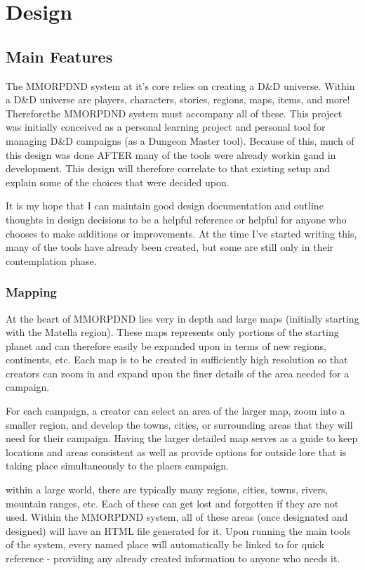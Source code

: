 \chapter{Design}

\section{Main Features}

The MMORPDND system at it's core relies on creating a D\&D universe. Within a D\&D universe are players, characters, stories, regions, maps, items, and more! Thereforethe MMORPDND system must accompany all of these. This project was initially conceived as a personal learning project and personal tool for managing D\&D campaigns (as a Dungeon Master tool). Because of this, much of this design was done AFTER many of the tools were already workin gand in development. This design will therefore correlate to that existing setup and explain some of the choices that were decided upon.

It is my hope that I can maintain good design documentation and outline thoughts in design decisions to be a helpful reference or helpful for anyone who chooses to make additions or improvements. At the time I've started writing this, many of the tools have already been created, but some are still only in their contemplation phase. 

\subsection{Mapping}

At the heart of MMORPDND lies very in depth and large maps (initially starting with the Matella region). These maps represents only portions of the starting planet and can therefore easily be expanded upon in terms of new regions, continents, etc. Each map is to be created in sufficiently high resolution so that creators can zoom in and expand upon the finer details of the area needed for a campaign.

For each campaign, a creator can select an area of the larger map, zoom into a smaller region, and develop the towns, cities, or surrounding areas that they will need for their campaign. Having the larger detailed map serves as a guide to keep locations and areas consistent as well as provide options for outside lore that is taking place simultaneously to the plaers campaign.

within a large world, there are typically many regions, cities, towns, rivers, mountain ranges, etc. Each of these can get lost and forgotten if they are not used. Within the MMORPDND system, all of these areas (once designated and designed) will have an HTML file generated for it. Upon running the main tools of the system, every named place will automatically be linked to for quick reference - providing any already created information to anyone who needs it.

